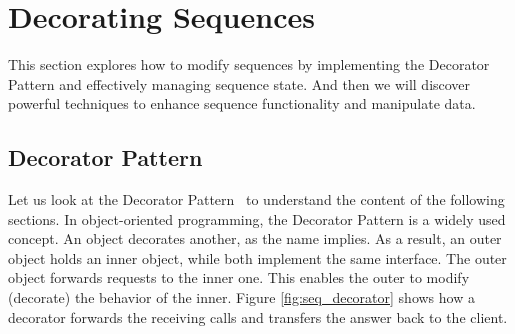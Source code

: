 \section{Decorating Sequences}
\label{sec:Decorating Sequences}
This section explores how to modify sequences by implementing the Decorator 
Pattern and effectively managing sequence state. And then we will discover 
powerful techniques to enhance sequence functionality and manipulate data.

\subsection{Decorator Pattern}
\label{sub:Decorator Pattern}
Let us look at the Decorator Pattern~\cite[p.~226]{gang_of_four_depa} to understand the content of the 
following sections. In object-oriented programming, the Decorator Pattern is a 
widely used concept. An object decorates another, as the name implies. As a 
result, an outer object holds an inner object, while both implement the same 
interface. The outer object forwards requests to the inner one. This enables
the outer to modify (decorate) the behavior of the inner. 
Figure \ref{fig:seq_decorator} shows how a decorator forwards the receiving calls and 
transfers the answer back to the client.

